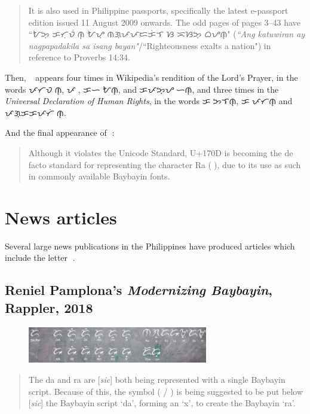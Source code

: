 \documentclass[a4paper,pagesize,openany,14pt,parskip=never]{scrbook}
\newcommand{\≈}{$\approx$}
\newcommand{\ra}{{\baybayin ᜍ}}
\begin{document}
\begin{quote}
    It is also used in Philippine passports, specifically the latest e-passport edition issued 11 August 2009 onwards. The odd pages of pages 3–43 have ``{\baybayin ᜀᜅ᜔ ᜃᜆᜓᜏᜒᜍᜈ᜔ ᜀᜌ᜔ ᜈᜄ᜔ᜉᜉᜇᜃᜒᜎ ᜐ ᜁᜐᜅ᜔ ᜊᜌᜈ᜔}" ({\em ``Ang katuwiran ay nagpapadakila sa isang bayan"}/``Righteousness exalts a nation") in reference to Proverbs 14:34.
\end{quote}

Then, \ra\ appears four times in Wikipedia's rendition of the Lord's Prayer, in the words {\baybayin ᜉᜆᜏᜍᜒᜈ᜔}, {\baybayin ᜉᜍ}, {\baybayin ᜃᜑᜍᜒᜀᜈ᜔}, and {\baybayin ᜃᜉᜅ᜔ᜌᜍᜒᜑᜈ᜔}, and three times in the {\em Universal Declaration of Human Rights}, in the words {\baybayin ᜃᜍᜅᜎᜈ᜔}, {\baybayin ᜃᜍᜉᜆᜈ᜔} and {\baybayin ᜉᜄ᜔ᜃᜃᜉᜆᜒᜍᜈ᜔}.

And the final appearance of \ra:

\begin{quote}
    Although it violates the Unicode Standard, U+170D is becoming the de facto standard for representing the character Ra ({\baybayin ᜍ}), due to its use as such in commonly available Baybayin fonts.
\end{quote}

\section{News articles}

Several large news publications in the Philippines have produced articles which include the letter {\baybayin ᜍ}.

\subsection{Reniel Pamplona's {\em Modernizing Baybayin}, Rappler, 2018}
\label{MB2018}

\begin{figure}[H]
\includegraphics[width=0.7\textwidth]{RapplerRA}
\end{figure}

\begin{quote}
    The da and ra are [{\em sic}] both being represented with a single Baybayin script. Because of this, the symbol ( / ) is being suggested to be put below [{\em sic}] the Baybayin script ‘da’, forming an ‘x’, to create the Baybayin ‘ra’.
\end{quote}
\end{document}
